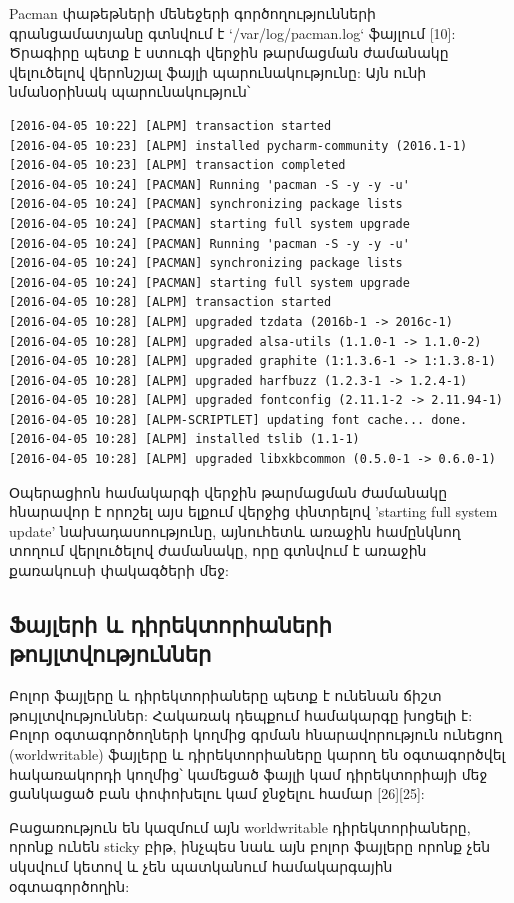 \documentclass[a4paper,12pt]{article}
\begin{document}
\begin{sloppypar}
Pacman փաթեթների մենեջերի գործողությունների գրանցամատյանը
գտնվում է `/var/log/pacman.log` ֆայլում [10]: Ծրագիրը պետք է ստուգի
վերջին թարմացման ժամանակը վելուծելով վերոնշյալ ֆայլի պարունակությունը:
Այն ունի նմանօրինակ պարունակություն՝

\begin{lstlisting}[language={}]
[2016-04-05 10:22] [ALPM] transaction started
[2016-04-05 10:23] [ALPM] installed pycharm-community (2016.1-1)
[2016-04-05 10:23] [ALPM] transaction completed
[2016-04-05 10:24] [PACMAN] Running 'pacman -S -y -y -u'
[2016-04-05 10:24] [PACMAN] synchronizing package lists
[2016-04-05 10:24] [PACMAN] starting full system upgrade
[2016-04-05 10:24] [PACMAN] Running 'pacman -S -y -y -u'
[2016-04-05 10:24] [PACMAN] synchronizing package lists
[2016-04-05 10:24] [PACMAN] starting full system upgrade
[2016-04-05 10:28] [ALPM] transaction started
[2016-04-05 10:28] [ALPM] upgraded tzdata (2016b-1 -> 2016c-1)
[2016-04-05 10:28] [ALPM] upgraded alsa-utils (1.1.0-1 -> 1.1.0-2)
[2016-04-05 10:28] [ALPM] upgraded graphite (1:1.3.6-1 -> 1:1.3.8-1)
[2016-04-05 10:28] [ALPM] upgraded harfbuzz (1.2.3-1 -> 1.2.4-1)
[2016-04-05 10:28] [ALPM] upgraded fontconfig (2.11.1-2 -> 2.11.94-1)
[2016-04-05 10:28] [ALPM-SCRIPTLET] updating font cache... done.
[2016-04-05 10:28] [ALPM] installed tslib (1.1-1)
[2016-04-05 10:28] [ALPM] upgraded libxkbcommon (0.5.0-1 -> 0.6.0-1)
\end{lstlisting}

Օպերացիոն համակարգի վերջին թարմացման ժամանակը հնարավոր է որոշել
այս ելքում վերջից փնտրելով 'starting full system update' նախադասոությունը,
այնուհետև առաջին համընկնող տողում վերլուծելով ժամանակը, որը գտնվում է
առաջին քառակուսի փակագծերի մեջ:


\subsection{Ֆայլերի և դիրեկտորիաների թույլտվություններ}


Բոլոր ֆայլերը և դիրեկտորիաները պետք է ունենան ճիշտ թույլտվություններ:
Հակառակ դեպքում համակարգը խոցելի է:
Բոլոր օգտագործողների կողմից գրման հնարավորություն ունեցող (worldwritable)
ֆայլերը և դիրեկտորիաները կարող են օգտագործվել հակառակորդի կողմից՝
կամեցած ֆայլի կամ դիրեկտորիայի մեջ ցանկացած բան փոփոխելու կամ ջնջելու
համար [26][25]:

Բացառություն են կազմում այն worldwritable դիրեկտորիաները, որոնք ունեն
sticky բիթ, ինչպես նաև այն բոլոր ֆայլերը որոնք չեն սկսվում կետով և չեն
պատկանում համակարգային օգտագործողին:


\end{sloppypar}
\end{document}
